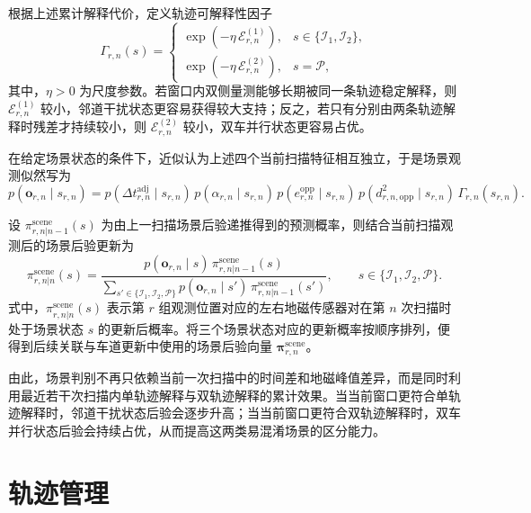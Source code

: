 \documentclass{xdupgthesis}
\begin{document}
根据上述累计解释代价，定义轨迹可解释性因子
\begin{equation}
	\Gamma_{r,n}(s)
	=
	\begin{cases}
		\exp\!\left(-\eta\,\mathcal E_{r,n}^{(1)}\right),
		& s\in\{\mathcal I_1,\mathcal I_2\},\\[4pt]
		\exp\!\left(-\eta\,\mathcal E_{r,n}^{(2)}\right),
		& s=\mathcal P,
	\end{cases}
\end{equation}
其中，$\eta>0$ 为尺度参数。若窗口内双侧量测能够长期被同一条轨迹稳定解释，则 $\mathcal E_{r,n}^{(1)}$ 较小，邻道干扰状态更容易获得较大支持；反之，若只有分别由两条轨迹解释时残差才持续较小，则 $\mathcal E_{r,n}^{(2)}$ 较小，双车并行状态更容易占优。

在给定场景状态的条件下，近似认为上述四个当前扫描特征相互独立，于是场景观测似然写为
\begin{equation}
	p(\mathbf o_{r,n}\mid s_{r,n})
	=
	p(\Delta t_{r,n}^{\mathrm{adj}}\mid s_{r,n})\,
	p(\alpha_{r,n}\mid s_{r,n})\,
	p(e_{r,n}^{\mathrm{opp}}\mid s_{r,n})\,
	p(d_{r,n,\mathrm{opp}}^2\mid s_{r,n})\,
	\Gamma_{r,n}(s_{r,n}).
\end{equation}

设 $\pi_{r,n|n-1}^{\mathrm{scene}}(s)$ 为由上一扫描场景后验递推得到的预测概率，则结合当前扫描观测后的场景后验更新为
\begin{equation}
	\pi_{r,n|n}^{\mathrm{scene}}(s)
	=
	\frac{
		p(\mathbf o_{r,n}\mid s)\,
		\pi_{r,n|n-1}^{\mathrm{scene}}(s)
	}{
		\sum\limits_{s'\in\{\mathcal I_1,\mathcal I_2,\mathcal P\}}
		p(\mathbf o_{r,n}\mid s')\,
		\pi_{r,n|n-1}^{\mathrm{scene}}(s')
	},
	\qquad
	s\in\{\mathcal I_1,\mathcal I_2,\mathcal P\}.
\end{equation}
式中，$\pi_{r,n|n}^{\mathrm{scene}}(s)$ 表示第 $r$ 组观测位置对应的左右地磁传感器对在第 $n$ 次扫描时处于场景状态 $s$ 的更新后概率。将三个场景状态对应的更新概率按顺序排列，便得到后续关联与车道更新中使用的场景后验向量 $\boldsymbol\pi_{r,n}^{\mathrm{scene}}$。

由此，场景判别不再只依赖当前一次扫描中的时间差和地磁峰值差异，而是同时利用最近若干次扫描内单轨迹解释与双轨迹解释的累计效果。当当前窗口更符合单轨迹解释时，邻道干扰状态后验会逐步升高；当当前窗口更符合双轨迹解释时，双车并行状态后验会持续占优，从而提高这两类易混淆场景的区分能力。



\section{轨迹管理}
\label{sec:ch3_track_management}
\end{document}

